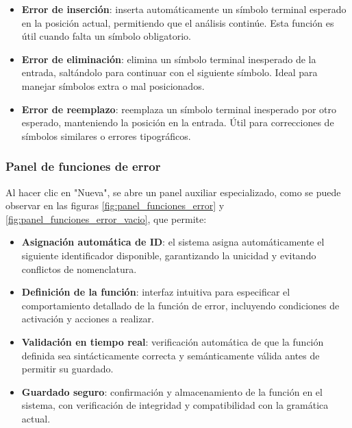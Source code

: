 \begin{itemize}
    \item \textbf{Error de inserción}: inserta automáticamente un símbolo terminal esperado en la posición actual, permitiendo que el análisis continúe. Esta función es útil cuando falta un símbolo obligatorio.
    \item \textbf{Error de eliminación}: elimina un símbolo terminal inesperado de la entrada, saltándolo para continuar con el siguiente símbolo. Ideal para manejar símbolos extra o mal posicionados.
    \item \textbf{Error de reemplazo}: reemplaza un símbolo terminal inesperado por otro esperado, manteniendo la posición en la entrada. Útil para correcciones de símbolos similares o errores tipográficos.
\end{itemize}

\subsubsection{Panel de funciones de error}

Al hacer clic en \string"Nueva\string", se abre un panel auxiliar especializado, como se puede observar en las figuras \ref{fig:panel_funciones_error} y \ref{fig:panel_funciones_error_vacio}, que permite:

\begin{itemize}
    \item \textbf{Asignación automática de ID}: el sistema asigna automáticamente el siguiente identificador disponible, garantizando la unicidad y evitando conflictos de nomenclatura.
    \item \textbf{Definición de la función}: interfaz intuitiva para especificar el comportamiento detallado de la función de error, incluyendo condiciones de activación y acciones a realizar.
    \item \textbf{Validación en tiempo real}: verificación automática de que la función definida sea sintácticamente correcta y semánticamente válida antes de permitir su guardado.
    \item \textbf{Guardado seguro}: confirmación y almacenamiento de la función en el sistema, con verificación de integridad y compatibilidad con la gramática actual.
\end{itemize}

